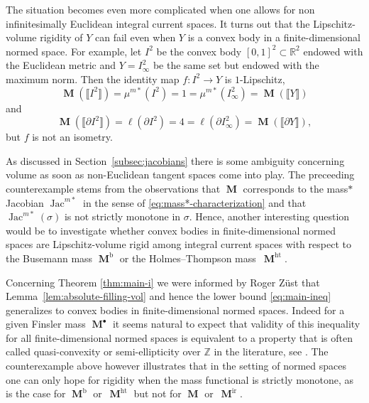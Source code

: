 \documentclass[reqno]{amsart}
\numberwithin{equation}{section}
\newcommand{\R}{\mathbb{R}}
\newcommand{\Jac}{\operatorname{Jac}}
\newcommand{\bb}[1]{\llbracket #1\rrbracket}
\newcommand{\susbet}{\subset}
\DeclareMathOperator{\mass}{\mathbf{M}}
\begin{document}
The situation becomes even more complicated when one allows for non infinitesimally Euclidean integral current spaces. It turns out that the Lipschitz-volume rigidity of $Y$ can fail even when $Y$ is a convex body in a finite-dimensional normed space. For example, let $I^2$ be the convex body $[0,1]^2\susbet \R^2$ endowed with the Euclidean metric and $Y=I^2_\infty$ be the same set but endowed with the maximum norm. Then the identity map $f\colon I^2\to Y$ is $1$-Lipschitz, 
\[
\mass(\bb{I^2})=\mu^{m*}(I^2)=1=\mu^{m*}(I^2_\infty)=\mass(\bb{Y})
\]
and 
\[
\mass(\bb{\partial I^2})= \ell(\partial I^2)=4=\ell(\partial I^2_\infty)=\mass(\bb{\partial Y}),
\]
but $f$ is not an isometry.

As discussed in Section~\ref{subsec:jacobians} there is some ambiguity concerning volume as soon as non-Euclidean tangent spaces come into play. The preceeding counterexample stems from the observations that $\mass$ corresponds to the mass\(\ast\) Jacobian $\Jac^{m*}$ in the sense of \eqref{eq:mass*-characterization} and that $\Jac^{m*}(\sigma)$ is not strictly monotone in $\sigma$. Hence, another interesting question would be to investigate whether convex bodies in finite-dimensional normed spaces are Lipschitz-volume rigid among integral current spaces with respect to the Busemann mass $\mass^{\text{b}}$ or the Holmes--Thompson mass~$\mass^{\text{ht}}$.

Concerning Theorem \ref{thm:main-i} we were informed by Roger Züst that Lemma~\ref{lem:absolute-filling-vol} and hence the lower bound \eqref{eq:main-ineq} generalizes to convex bodies in finite-dimensional normed spaces. Indeed for a given Finsler mass $\mass^{\bullet}$ it seems natural to expect that validity of this inequality for all finite-dimensional normed spaces is   equivalent to a property that is often called quasi-convexity or semi-ellipticity over $\mathbb{Z}$ in the literature, see \cite{APT04, Iva08, lw17}. The counterexample above however illustrates that in the setting of normed spaces one can only hope for rigidity when the mass functional is strictly monotone, as is the case for $\mass^{\text{b}}$ or~$\mass^{\text{ht}}$ but not for $\mass$ or~$\mass^{\text{ir}}$.



\end{document}
